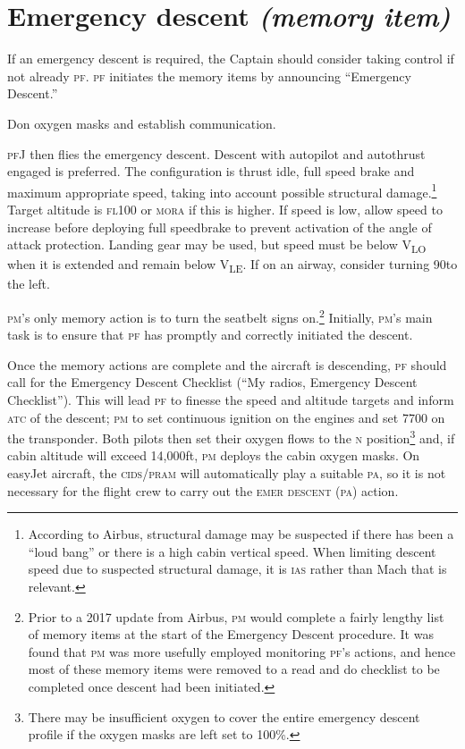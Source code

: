 \documentclass[a5paper,11pt,twoside]{book}
\newcommand{\V}[1]{V\textsubscript{#1}}
\newcommand{\ac}[1]{{\scshape\MakeLowercase{#1}}}
\newcommand{\ecam}[2]{{\scshape\MakeLowercase{\uline{#1} #2}}}
\begin{document}
\section{Emergency descent \emph{(memory item)}}

If an emergency descent is required, the Captain should consider taking control
if not already \ac{PF}. \ac{PF} initiates the memory items by announcing
``Emergency Descent.''

Don oxygen masks and establish communication.

\ac{PF}J then flies the emergency descent.  Descent with autopilot and autothrust
engaged is preferred. The configuration is thrust idle, full speed brake and
maximum appropriate speed, taking into account possible structural
damage.\footnote{According to Airbus, structural damage may be suspected if
there has been a ``loud bang'' or there is a high cabin vertical speed. When
limiting descent speed due to suspected structural damage, it is \ac{IAS} rather
than Mach that is relevant.} Target altitude is \ac{FL100} or \ac{MORA} if this
is higher. If speed is low, allow speed to increase before deploying full
speedbrake to prevent activation of the angle of attack protection. Landing gear
may be used, but speed must be below \V{LO} when it is extended and remain below
\V{LE}. If on an airway, consider turning 90\textdegree{ }to the left.

\ac{PM}'s only memory action is to turn the seatbelt signs on.\footnote{Prior to
a 2017 update from Airbus, \ac{PM} would complete a fairly lengthy list of
memory items at the start of the Emergency Descent procedure. It was found that
\ac{PM} was more usefully employed monitoring \ac{PF}'s actions, and hence most
of these memory items were removed to a read and do checklist to be completed
once descent had been initiated.} Initially, \ac{PM}'s main task is to ensure
that \ac{PF} has promptly and correctly initiated the descent.

Once the memory actions are complete and the aircraft is descending, \ac{PF}
should call for the Emergency Descent Checklist (``My radios, Emergency Descent
Checklist''). This will lead \ac{PF} to finesse the speed and altitude targets and
inform \ac{ATC} of the descent; \ac{PM} to set continuous ignition on the engines and set
7700 on the transponder. Both pilots then set their oxygen flows to the \ac{N}
position\footnote{There may be insufficient oxygen to cover the entire emergency
descent profile if the oxygen masks are left set to 100\%.} and, if cabin
altitude will exceed 14,000ft, \ac{PM} deploys the cabin oxygen masks. On easyJet
aircraft, the \ac{CIDS}/\ac{PRAM} will automatically play a suitable \ac{PA}, so it is not
necessary for the flight crew to carry out the \ecam{}{EMER DESCENT (PA)} action.
\end{document}
